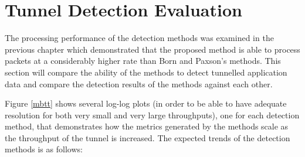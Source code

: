 \documentclass[12pt]{report}
\theoremstyle{remark}
\theoremstyle{definition}
\theoremstyle{definition}
\theoremstyle{definition}
\begin{document}
\chapter{Tunnel Detection Evaluation}
\label{chap-evaluation}
\label{tunnel-detection-performance}

The processing performance of the detection methods was examined in the previous
chapter which demonstrated that the proposed method is able to process packets
at a considerably higher rate than Born and Paxson's methods. This section will
compare the ability of the methods to detect tunnelled application data and
compare the detection results of the methods against each other.

Figure \ref{mbtt} shows several log-log plots (in order to be able to have
adequate resolution for both very small and very large throughputs), one for
each detection method, that demonstrates how the metrics generated by the
methods scale as the throughput of the tunnel is increased. The expected trends
of the detection methods is as follows:
\end{document}
